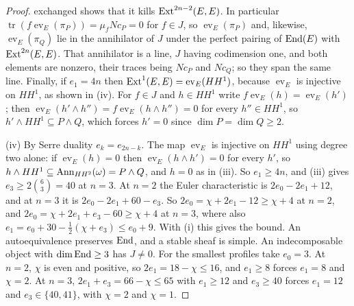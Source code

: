 \begin{proof}
exchanged shows that it kills $\operatorname{Ext}^{2n-2}(E,E)$. In particular
$\operatorname{tr}(f\operatorname{ev}_{E}(\pi_{P}))=\mu_{f}Nc_{P}=0$ for
$f\in J$, so $\operatorname{ev}_{E}(\pi_{P})$ and, likewise,
$\operatorname{ev}_{E}(\pi_{Q})$ lie in the annihilator of $J$ under the
perfect pairing of $\operatorname{End}(E)$ with $\operatorname{Ext}^{2n}(E,E)$. That annihilator is a
line, $J$ having codimension one, and both elements are nonzero, their traces
being $Nc_{P}$ and $Nc_{Q}$; so they span the same line. Finally, if
$e_{1}=4n$ then $\operatorname{Ext}^{1}(E,E)=\operatorname{ev}_{E}(HH^{1})$, because
$\operatorname{ev}_{E}$ is injective on $HH^{1}$, as shown in (iv). For
$f\in J$ and $h\in HH^{1}$ write $f\operatorname{ev}_{E}(h)=
\operatorname{ev}_{E}(h')$; then
$\operatorname{ev}_{E}(h'\wedge h'')=f\operatorname{ev}_{E}(h\wedge h'')=0$ for
every $h''\in HH^{1}$, so $h'\wedge HH^{1}\subseteq P\wedge Q$, which forces
$h'=0$ since $\dim P=\dim Q\ge2$.

(iv) By Serre duality $e_{k}=e_{2n-k}$. The map $\operatorname{ev}_{E}$ is
injective on $HH^{1}$ using degree two alone: if $\operatorname{ev}_{E}(h)=0$
then $\operatorname{ev}_{E}(h\wedge h')=0$ for every $h'$, so
$h\wedge HH^{1}\subseteq\operatorname{Ann}_{HH^{2}}(\omega)=P\wedge Q$, and $h=0$ as in
(iii). So $e_{1}\ge4n$, and (iii) gives
$e_{3}\ge2\binom{6}{3}=40$ at $n=3$. At $n=2$ the Euler
characteristic is $2e_{0}-2e_{1}+12$, and at $n=3$ it is
$2e_{0}-2e_{1}+60-e_{3}$. So $2e_{0}=\chi+2e_{1}-12\ge\chi+4$ at $n=2$, and
$2e_{0}=\chi+2e_{1}+e_{3}-60\ge\chi+4$ at $n=3$, where also
$e_{1}=e_{0}+30-\frac12(\chi+e_{3})\le e_{0}+9$. With (i) this gives the
bound. An autoequivalence preserves $\operatorname{End}$, and a stable sheaf is simple.
An indecomposable object with $\dim\operatorname{End}\ge3$ has $J\ne0$. For the smallest
profiles take $e_{0}=3$. At $n=2$, $\chi$ is even and positive, so
$2e_{1}=18-\chi\le16$, and $e_{1}\ge8$ forces $e_{1}=8$ and $\chi=2$. At
$n=3$, $2e_{1}+e_{3}=66-\chi\le65$ with $e_{1}\ge12$ and $e_{3}\ge40$
forces $e_{1}=12$ and $e_{3}\in\{40,41\}$, with $\chi=2$ and $\chi=1$.
\end{proof}

